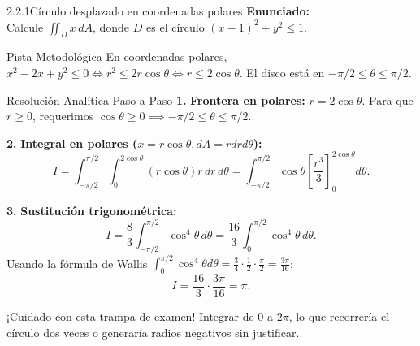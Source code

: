 \documentclass[11pt,a4paper]{article}
\begin{document}
\begin{nivelbox}{2.2.1}{Círculo desplazado en coordenadas polares}
\textbf{Enunciado:}\\
Calcule $\iint_D x \, dA$, donde $D$ es el círculo $(x - 1)^2 + y^2 \le 1$.

\begin{observacionbox}{Pista Metodológica}
En coordenadas polares, $x^2 - 2x + y^2 \le 0 \iff r^2 \le 2r\cos\theta \iff r \le 2\cos\theta$. El disco está en $-\pi/2 \le \theta \le \pi/2$.
\end{observacionbox}

\begin{ejerciciobox}{Resolución Analítica Paso a Paso}
\smallskip\noindent\textbf{1.} \textbf{Frontera en polares:}
$r = 2\cos\theta$. Para que $r \ge 0$, requerimos $\cos\theta \ge 0 \implies -\pi/2 \le \theta \le \pi/2$.

\smallskip\noindent\textbf{2.} \textbf{Integral en polares ($x = r\cos\theta, dA = r dr d\theta$):}
\[I = \int_{-\pi/2}^{\pi/2} \int_0^{2\cos\theta} (r\cos\theta) r \, dr \, d\theta = \int_{-\pi/2}^{\pi/2} \cos\theta \left[ \frac{r^3}{3} \right]_0^{2\cos\theta} d\theta.\]

\smallskip\noindent\textbf{3.} \textbf{Sustitución trigonométrica:}
\[I = \frac{8}{3} \int_{-\pi/2}^{\pi/2} \cos^4\theta \, d\theta = \frac{16}{3} \int_0^{\pi/2} \cos^4\theta \, d\theta.\]
Usando la fórmula de Wallis $\int_0^{\pi/2} \cos^4\theta d\theta = \frac{3}{4} \cdot \frac{1}{2} \cdot \frac{\pi}{2} = \frac{3\pi}{16}$:
\[I = \frac{16}{3} \cdot \frac{3\pi}{16} = \pi.\]
\end{ejerciciobox}

\begin{errorbox}{¡Cuidado con esta trampa de examen!}
Integrar de $0$ a $2\pi$, lo que recorrería el círculo dos veces o generaría radios negativos sin justificar.
\end{errorbox}
\end{nivelbox}
\bigskip
\end{document}
